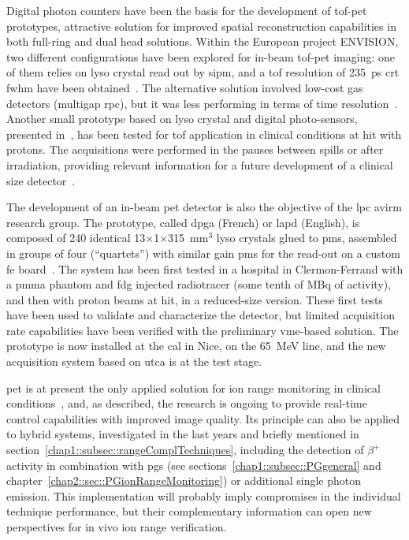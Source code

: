 Digital photon counters have been the basis for the development of \gls{tof}-\gls{pet} prototypes, attractive solution for improved spatial reconstruction capabilities in both full-ring and dual head solutions. Within the European project ENVISION, two different configurations have been explored for in-beam \gls{tof}-\gls{pet} imaging: one of them relies on \gls{lyso} crystal read out by \gls{sipm}, and a \gls{tof} resolution of 235~ps \gls{crt} \gls{fwhm} have been obtained~\parencite{Morrocchi2012}. The alternative solution involved low-cost gas detectors (multigap \gls{rpc}), but it was less performing in terms of time resolution~\parencite{Watts2013}. Another small prototype based on \gls{lyso} crystal and digital photo-sensors, presented in~\parencite{Degenhardt2012}, has been tested for \gls{tof} application in clinical conditions at \gls{hit} with protons. The acquisitions were performed in the pauses between spills or after irradiation, providing relevant information for a future development of a clinical size detector~\parencite{CambraiaLopes2016}.    

The development of an in-beam \gls{pet} detector is also the objective of the \gls{lpc} \gls{avirm} research group. The prototype, called \gls{dpga} (French) or \gls{lapd} (English), is composed of 240 identical 13$\times$1$\times$315~mm$^3$ \gls{lyso} crystals glued to \glspl{pm}, assembled in groups of four (\enquote{quartets}) with similar gain \glspl{pm} for the read-out on a custom \gls{fe} board~\parencite{Montarou2016}. The system has been first tested in a hospital in Clermon-Ferrand with a \gls{pmma} phantom and \gls{fdg} injected radiotracer (some tenth of MBq of activity), and then with proton beams at \gls{hit}, in a reduced-size version. These first tests have been used to validate and characterize the detector, but limited acquisition rate capabilities have been verified with the preliminary \gls{vme}-based solution. The prototype is now installed at the \gls{cal} in Nice, on the 65~MeV line, and the new acquisition system based on \gls{utca} is at the test stage.  

\gls{pet} is at present the only applied solution for ion range monitoring in clinical conditions~\parencite{Yamaya2018}, and, as described, the research is ongoing to provide real-time control capabilities with improved image quality. Its principle can also be applied to hybrid systems, investigated in the last years and briefly mentioned in section~\ref{chap1::subsec::rangeComplTechniques}, including the detection of $\beta^+$ activity in combination with \glspl{pg} (see sections~\ref{chap1::subsec::PGgeneral} and chapter~\ref{chap2::sec::PGionRangeMonitoring}) or additional single photon emission. This implementation will probably imply compromises in the individual technique performance, but their complementary information can open new perspectives for in vivo ion range verification.  

